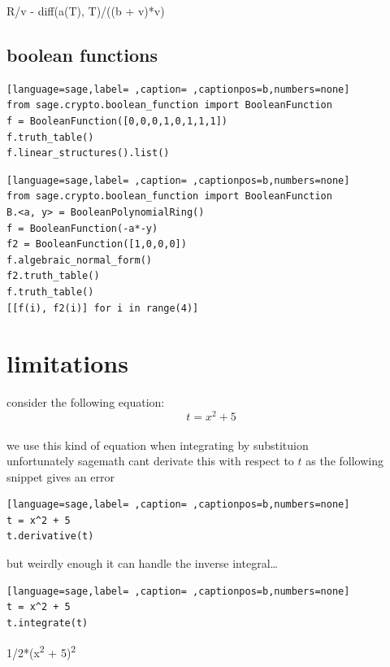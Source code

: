 \documentclass[a4paper,12pt]{article}
\begin{document}
R/v - diff(a(T), T)/((b + v)*v)\\[0pt]
\subsection{boolean functions}
\label{sec:orgfc3ed17}
\begin{lstlisting}[language=sage,label= ,caption= ,captionpos=b,numbers=none]
from sage.crypto.boolean_function import BooleanFunction
f = BooleanFunction([0,0,0,1,0,1,1,1])
f.truth_table()
f.linear_structures().list()
\end{lstlisting}

\begin{lstlisting}[language=sage,label= ,caption= ,captionpos=b,numbers=none]
from sage.crypto.boolean_function import BooleanFunction
B.<a, y> = BooleanPolynomialRing()
f = BooleanFunction(-a*-y)
f2 = BooleanFunction([1,0,0,0])
f.algebraic_normal_form()
f2.truth_table()
f.truth_table()
[[f(i), f2(i)] for i in range(4)]
\end{lstlisting}
\section{limitations}
\label{sec:org181707a}

consider the following equation:\\[0pt]

\[ t = x^2 + 5 \]\\[0pt]

we use this kind of equation when integrating by substituion\\[0pt]

unfortunately sagemath cant derivate this with respect to \(t\) as the following snippet gives an error\\[0pt]

\begin{lstlisting}[language=sage,label= ,caption= ,captionpos=b,numbers=none]
t = x^2 + 5
t.derivative(t)
\end{lstlisting}

but weirdly enough it can handle the inverse integral\ldots{}\\[0pt]

\begin{lstlisting}[language=sage,label= ,caption= ,captionpos=b,numbers=none]
t = x^2 + 5
t.integrate(t)
\end{lstlisting}

1/2*(x\textsuperscript{2} + 5)\textsuperscript{2}\\[0pt]
\end{document}
